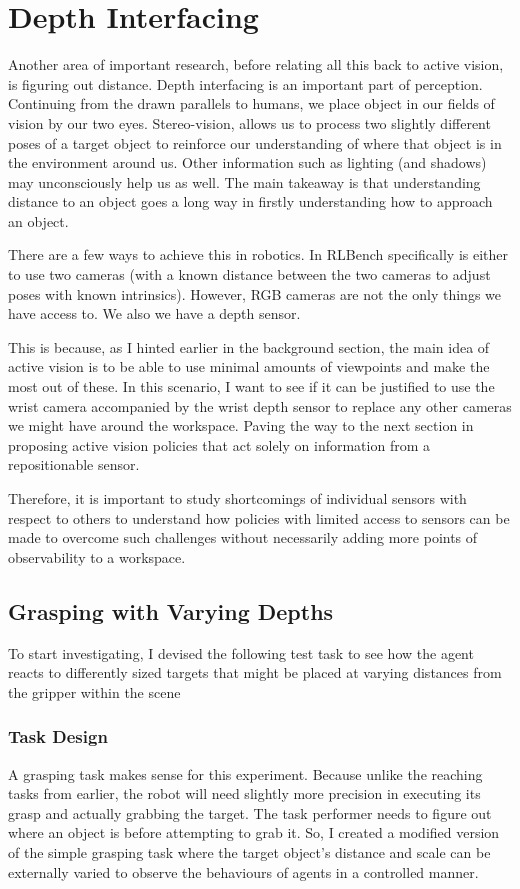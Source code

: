 \section{Depth Interfacing}\label{sec:depth-interfacing}
Another area of important research, before relating all this back to active vision, is figuring out distance. Depth interfacing is an important part of perception. Continuing from the drawn parallels to humans, we place object in our fields of vision by our two eyes. Stereo-vision, allows us to process two slightly different poses of a target object to reinforce our understanding of where that object is in the environment around us. Other information such as lighting (and shadows) may unconsciously help us as well. The main takeaway is that understanding distance to an object goes a long way in firstly understanding how to approach an object.

There are a few ways to achieve this in robotics. In RLBench specifically is either to use two cameras (with a known distance between the two cameras to adjust poses with known intrinsics). However, RGB cameras are not the only things we have access to. We also we have a depth sensor.

This is because, as I hinted earlier in the background section, the main idea of active vision is to be able to use minimal amounts of viewpoints and make the most out of these. In this scenario, I want to see if it can be justified to use the wrist camera accompanied by the wrist depth sensor to replace any other cameras we might have around the workspace. Paving the way to the next section in proposing active vision policies that act solely on information from a repositionable sensor.

Therefore, it is important to study shortcomings of individual sensors with respect to others to understand how policies with limited access to sensors can be made to overcome such challenges without necessarily adding more points of observability to a workspace.

\subsection{Grasping with Varying Depths}
To start investigating, I devised the following test task to see how the agent reacts to differently sized targets that might be placed at varying distances from the gripper within the scene

\subsubsection{Task Design}
A grasping task makes sense for this experiment. Because unlike the reaching tasks from earlier, the robot will need slightly more precision in executing its grasp and actually grabbing the target. The task performer needs to figure out where an object is before attempting to grab it. So, I created a modified version of the simple grasping task where the target object's distance and scale can be externally varied to observe the behaviours of agents in a controlled manner.

